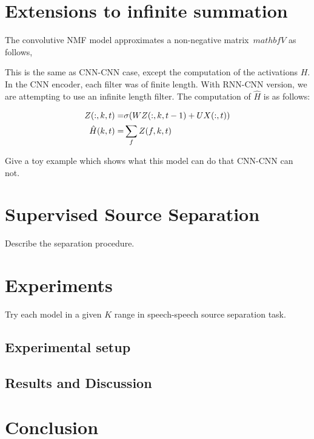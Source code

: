 \documentclass{article}
\begin{document}
\section{Extensions to infinite summation}
\label{sec:rnncnn}
The convolutive NMF model approximates a non-negative matrix~$mathbf{V}$ as follows,


This is the same as CNN-CNN case, except the computation of the activations $H$. In the CNN encoder, each filter was of finite length. With RNN-CNN version, we are attempting to use an infinite length filter. The computation of $\hat H$ is as follows: 

\begin{align}
	Z(:,k,t) =& \sigma( W Z(:,k,t-1) + U X(:,t)) \notag \\
	\hat H(k,t) =& \sum_f Z(f,k,t)
\end{align}

Give a toy example which shows what this model can do that CNN-CNN can not. 



\section{Supervised Source Separation}
\label{sec:ss}
Describe the separation procedure.

\section{Experiments}
\label{sec:experiments}
Try each model in a given $K$ range in speech-speech source separation task.

\subsection{Experimental setup}
\label{subsec:setup}

\subsection{Results and Discussion}
\label{subsec:results}

\section{Conclusion}
\label{sec:conclusion}




\end{document}
